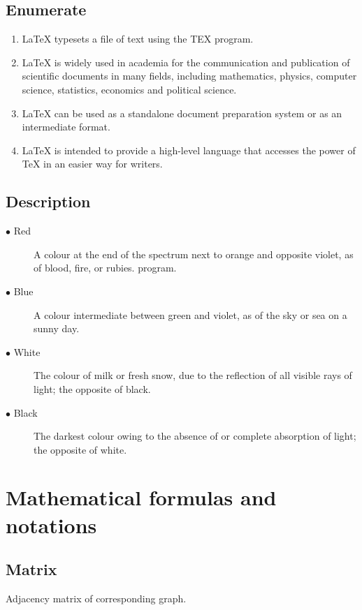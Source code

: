 \documentclass[12pt]{article}
\begin{document}
\subsection{Enumerate}
\begin{enumerate}
\item \LaTeX{} typesets a file of text using the TEX program.
\item \LaTeX{} is widely used in academia for the communication and publication of scientific documents in many fields, including mathematics, physics,
computer science, statistics, economics and political science.
\item \LaTeX{} can be used as a standalone document preparation system or as an intermediate format.
\item \LaTeX{} is intended to provide a high-level language that accesses the power of TeX in an easier way for writers.
\end{enumerate}

\subsection{Description}
\begin{description}
\item[$\bullet$ Red] A colour at the end of the spectrum next to orange and opposite violet, as of blood, fire, or rubies. program.
\item[$\bullet$ Blue] A colour intermediate between green and violet, as of the sky or sea on a sunny day.
\item[$\bullet$ White] The colour of milk or fresh snow, due to the reflection of all visible rays of light; the opposite of black.
\item[$\bullet$ Black] The darkest colour owing to the absence of or complete absorption of light; the opposite of white.
\end{description}

\newpage
\section{Mathematical formulas and notations}

\subsection{Matrix}
Adjacency matrix of corresponding graph.

\medskip
\end{document}
